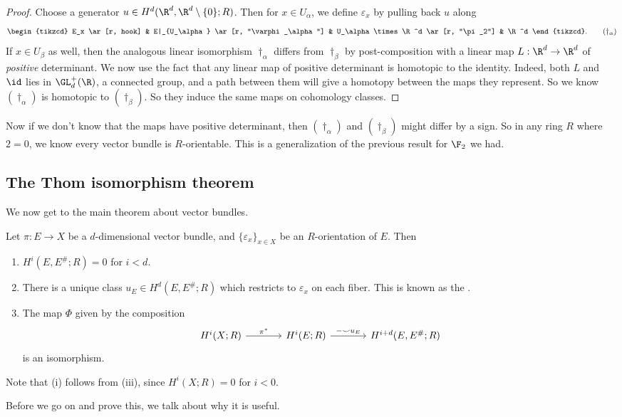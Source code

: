 \documentclass[a4paper]{article}
\theoremstyle{definition}
\begin{document}
\begin{proof}
  Choose a generator $u \in H^d(\R^d, \R^d \setminus \{0\}; R)$. Then for $x \in U_\alpha$, we define $\varepsilon_x$ by pulling back $u$ along
  \[
    \begin{tikzcd}
      E_x \ar[r, hook] & E|_{U_\alpha} \ar[r, "\varphi_\alpha"] & U_\alpha \times \R^d \ar[r, "\pi_2"] & \R^d
    \end{tikzcd}.\tag{$\dagger_\alpha$}
  \]
  If $x \in U_\beta$ as well, then the analogous linear isomorphism $\dagger_\alpha$ differs from $\dagger_\beta$ by post-composition with a linear map $L: \R^d \to \R^d$ of \emph{positive} determinant. We now use the fact that any linear map of positive determinant is homotopic to the identity. Indeed, both $L$ and $\id$ lies in $\GL_d^+(\R)$, a connected group, and a path between them will give a homotopy between the maps they represent. So we know $(\dagger_\alpha)$ is homotopic to $(\dagger_\beta)$. So they induce the same maps on cohomology classes.
\end{proof}
Now if we don't know that the maps have positive determinant, then $(\dagger_\alpha)$ and $(\dagger_\beta)$ might differ by a sign. So in any ring $R$ where $2 = 0$, we know every vector bundle is $R$-orientable. This is a generalization of the previous result for $\F_2$ we had.

\subsection{The Thom isomorphism theorem}
We now get to the main theorem about vector bundles.
\begin{thm}
  Let $\pi: E \to X$ be a $d$-dimensional vector bundle, and $\{\varepsilon_x\}_{x \in X}$ be an $R$-orientation of $E$. Then
  \begin{enumerate}
    \item $H^i(E, E^\#; R) = 0$ for $i < d$.
    \item There is a unique class $u_E \in H^d(E, E^\#; R)$ which restricts to $\varepsilon_x$ on each fiber. This is known as the .
    \item The map $\Phi$ given by the composition
      \[
        \begin{tikzcd}[column sep=large]
          H^i(X; R) \ar[r, "\pi^*"] & H^i(E; R) \ar[r, "-\smile u_E"] & H^{i + d}(E, E^\#; R)
        \end{tikzcd}
      \]
      is an isomorphism.
  \end{enumerate}
  Note that (i) follows from (iii), since $H^i(X; R) = 0$ for $i < 0$.
\end{thm}
Before we go on and prove this, we talk about why it is useful.
\end{document}
